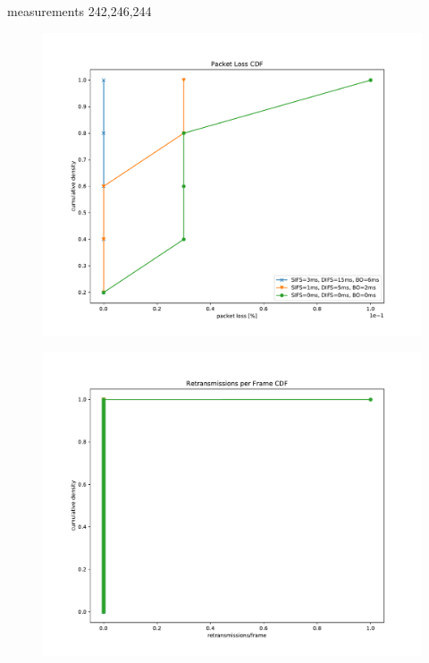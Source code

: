 \documentclass{article}
\begin{document}
measurements 242,246,244

\begin{figure}
	\includegraphics[width=\textwidth]{cdf/packet_loss_cdf}
\end{figure}

\begin{figure}
	\includegraphics[width=\textwidth]{cdf/retransmissions_per_frame_cdf}
\end{figure}
\end{document}
